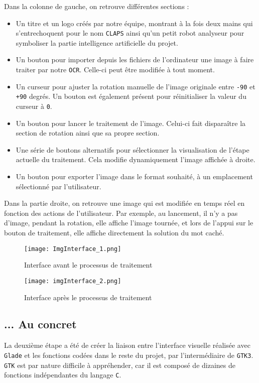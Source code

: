 \documentclass{article}
\begin{document}
Dans la colonne de gauche, on retrouve différentes sections :
\begin{itemize}
    \item Un titre et un logo créés par notre équipe, montrant à la fois deux mains qui s'entrechoquent pour le nom \texttt{CLAPS} ainsi qu'un petit robot analyseur pour symboliser la partie intelligence artificielle du projet.
    \item Un bouton pour importer depuis les fichiers de l'ordinateur une image à faire traiter par notre \texttt{OCR}. Celle-ci peut être modifiée à tout moment.
    \item Un curseur pour ajuster la rotation manuelle de l'image originale entre \texttt{-90} et \texttt{+90} degrés. Un bouton est également présent pour réinitialiser la valeur du curseur à \texttt{0}.
    \item Un bouton pour lancer le traitement de l'image. Celui-ci fait disparaître la section de rotation ainsi que sa propre section.
    \item Une série de boutons alternatifs pour sélectionner la visualisation de l'étape actuelle du traitement. Cela modifie dynamiquement l'image affichée à droite.
    \item Un bouton pour exporter l'image dans le format souhaité, à un emplacement sélectionné par l'utilisateur.\\
\end{itemize}

Dans la partie droite, on retrouve une image qui est modifiée en temps réel en fonction des actions de l'utilisateur. Par exemple, au lancement, il n'y a pas d'image, pendant la rotation, elle affiche l'image tournée, et lors de l'appui sur le bouton de traitement, elle affiche directement la solution du mot caché.\\

\begin{figure}[H]
    \centering
    \texttt{[image: ImgInterface\_1.png]}
    \caption{Interface avant le processus de traitement}
\end{figure}

\begin{figure}[H]
    \centering
    \texttt{[image: imgInterface\_2.png]}
    \caption{Interface après le processus de traitement}
\end{figure}

\subsection{... Au concret}
La deuxième étape a été de créer la liaison entre l'interface visuelle réalisée avec \texttt{Glade} et les fonctions codées dans le reste du projet, par l'intermédiaire de \texttt{GTK3}. \texttt{GTK} est par nature difficile à appréhender, car il est composé de dizaines de fonctions indépendantes du langage \texttt{C}.\\
\end{document}
